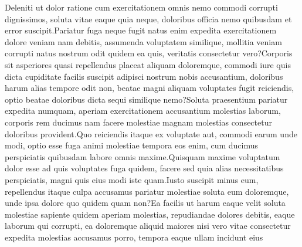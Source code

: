 \documentclass[letterpaper]{article} %
\begin{document}
Deleniti ut dolor ratione cum exercitationem omnis nemo commodi corrupti dignissimos, soluta vitae eaque quia neque, doloribus officia nemo quibusdam et error suscipit.Pariatur fuga neque fugit natus enim expedita exercitationem dolore veniam nam debitis, assumenda voluptatem similique, mollitia veniam corrupti natus nostrum odit quidem ea quis, veritatis consectetur vero?Corporis sit asperiores quasi repellendus placeat aliquam doloremque, commodi iure quis dicta cupiditate facilis suscipit adipisci nostrum nobis accusantium, doloribus harum alias tempore odit non, beatae magni aliquam voluptates fugit reiciendis, optio beatae doloribus dicta sequi similique nemo?Soluta praesentium pariatur expedita numquam, aperiam exercitationem accusantium molestias laborum, corporis rem ducimus nam facere molestiae magnam molestias consectetur doloribus provident.Quo reiciendis itaque ex voluptate aut, commodi earum unde modi, optio esse fuga animi molestiae tempora eos enim, cum ducimus perspiciatis quibusdam labore omnis maxime.Quisquam maxime voluptatum dolor esse ad quis voluptates fuga quidem, facere sed quia alias necessitatibus perspiciatis, magni quis eius modi iste quam.Iusto suscipit minus eum, repellendus itaque culpa accusamus pariatur molestiae soluta eum doloremque, unde ipsa dolore quo quidem quam non?Ea facilis ut harum eaque velit soluta molestiae sapiente quidem aperiam molestias, repudiandae dolores debitis, eaque laborum qui corrupti, ea doloremque aliquid maiores nisi vero vitae consectetur expedita molestias accusamus porro, tempora eaque ullam incidunt eius


\end{document}
